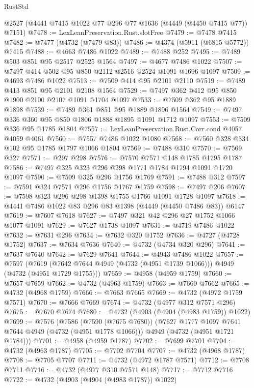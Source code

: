 \begin{lexlean}{RustStd}
\begin{coremodule}
{\begin{coremodule}
{{{{{{{{{{{{{{    @2527
    (@4441 @7415 @1022 @77 @296 @77 @1636 (@4449 (@4450 @7415 @77)) @7151)
@7478 := LexLeanPreservation.Rust.slotFree
@7479 := @7478 @7415
@7482 := @7477 (@4732 (@7479 @83))
@7486 := @4374 (@5911 (@6815 @5772)) @7415
@7488 := @4663 @7486 @1022
@7489 := @7488 @252
@7495 := @7489 @503 @851 @95 @2517 @2525 @1564
@7497 := @4677 @7486 @1022
@7507 := @7497 @414 @502 @95 @850 @2112 @2516 @2524 @1091 @1696 @1097
@7509 := @4693 @7486 @1022
@7513 := @7509 @414 @95 @2101 @2110
@7519 := @7489 @413 @851 @95 @2101 @2108 @1564
@7529 := @7497 @362 @412 @95 @850 @1900 @2100 @2107 @1091 @1704 @1097
@7533 := @7509 @362 @95 @1889 @1898
@7539 := @7489 @361 @851 @95 @1889 @1896 @1564
@7549 := @7497 @336 @360 @95 @850 @1806 @1888 @1895 @1091 @1712 @1097
@7553 := @7509 @336 @95 @1785 @1804
@7557 := LexLeanPreservation.Rust.Corr.cond @4057 @4059 @4061
@7560 := @7557 @7486 @1022 @1080
@7568 := @7560 @328 @334 @102 @95 @1785 @1797 @1066 @1804
@7569 := @7488 @310
@7570 := @7569 @327
@7571 := @297 @298
@7576 := @7570 @7571 @148 @1785 @1795 @1787
@7586 := @7497 @325 @323 @296 @298 @1771 @1784 @1794 @1091 @1720 @1097
@7590 := @7509 @325 @296 @1756 @1769
@7591 := @7488 @312
@7597 := @7591 @324 @7571 @296 @1756 @1767 @1759
@7598 := @7497 @206
@7607 := @7598 @323 @296 @298 @1398 @1755 @1766 @1091 @1728 @1097
@7618 := @4441 @7486 @1022 @83 @296 @83 @1398 (@4449 (@4450 @7486 @83)) @6147
@7619 := @7607 @7618
@7627 := @7497 @321 @42 @296 @27 @1752 @1066 @1077 @1091
@7629 := @7627 @1738 @1097
@7631 := @4719 @7486 @1022
@7632 := @7631 @296
@7634 := @7632 @320 @1752
@7636 := @4727 (@4728 @1752)
@7637 := @7634 @7636
@7640 := @4732 (@4734 @320 @296)
@7641 := @7637 @7640
@7642 := @7629 @7641
@7644 := @4943 @7486 @1022
@7657 := @7597
    (@7619 (@7642 @7644 @4949 (@4732 (@4951 @1739 @1066))) @4949 (@4732 (@4951 @1729 @1755)))
@7659 := @4958 (@4959 @1759)
@7660 := @7657 @7659
@7662 := @4732 (@4963 @1759)
@7663 := @7660 @7662
@7665 := @4732 (@4968 @1759)
@7666 := @7663 @7665
@7669 := @4732 (@4972 @1759 @7571)
@7670 := @7666 @7669
@7674 := @4732 (@4977 @312 @7571 @296)
@7675 := @7670 @7674
@7680 := @4732 (@4903 (@4904 (@4983 @1759)) @1022)
@7699 := @7576
    (@7586
      (@7590 (@7675 @7680))
      (@7627 @1777 @1097 @7641 @7644 @4949 (@4732 (@4951 @1778 @1066)))
      @4949
      (@4732 (@4951 @1721 @1784)))
@7701 := @4958 (@4959 @1787)
@7702 := @7699 @7701
@7704 := @4732 (@4963 @1787)
@7705 := @7702 @7704
@7707 := @4732 (@4968 @1787)
@7708 := @7705 @7707
@7711 := @4732 (@4972 @1787 @7571)
@7712 := @7708 @7711
@7716 := @4732 (@4977 @310 @7571 @148)
@7717 := @7712 @7716
@7722 := @4732 (@4903 (@4904 (@4983 @1787)) @1022)
}}}}}}}}}}}}}}
\end{coremodule}}
\end{coremodule}
\end{lexlean}

